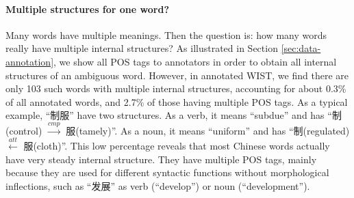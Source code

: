 \paragraph{Multiple structures for one word?} 
Many words have multiple meanings.  
Then the question is: how many words really have multiple internal  structures? 
As illustrated in Section \ref{sec:data-annotation}, we show all POS tags to annotators in order to obtain all internal structures of an ambiguous word.
However, in annotated WIST, we find there are only 103 such words with multiple internal structures, accounting for about 0.3\% of all annotated words, %
and 2.7\% of those having multiple POS tags. %
As a typical example, ``制服'' have two structures. 
As a verb, it means ``subdue'' and has ``制(control) $\xrightarrow{cmp}$ 服(tamely)''. As a noun, it means ``uniform'' and has ``制(regulated) $\xleftarrow{att}$ 服(cloth)''. 
This low percentage reveals that most Chinese words actually have very steady internal structure. They have multiple POS tags, mainly because they are used for different syntactic functions without morphological inflections, such as ``发展'' as verb (``develop'') or noun (``development''). 




